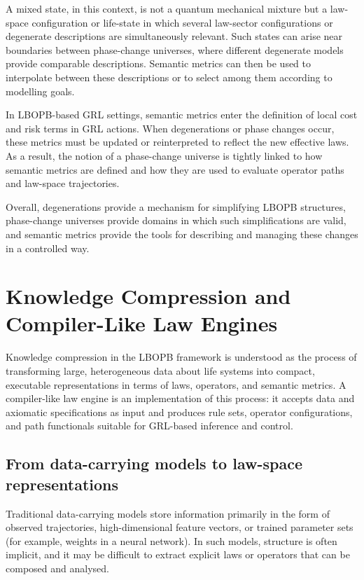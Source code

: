 \documentclass[11pt]{book}
\theoremstyle{plain}
\theoremstyle{definition}
\theoremstyle{remark}
\begin{document}
A mixed state, in this context, is not a quantum mechanical mixture but
a law-space configuration or life-state in which several law-sector
configurations or degenerate descriptions are simultaneously relevant.
Such states can arise near boundaries between phase-change universes,
where different degenerate models provide comparable descriptions.
Semantic metrics can then be used to interpolate between these
descriptions or to select among them according to modelling goals.

In LBOPB-based GRL settings, semantic metrics enter the definition of
local cost and risk terms in GRL actions. When degenerations or
phase changes occur, these metrics must be updated or reinterpreted to
reflect the new effective laws. As a result, the notion of a
phase-change universe is tightly linked to how semantic metrics are
defined and how they are used to evaluate operator paths and law-space
trajectories.

Overall, degenerations provide a mechanism for simplifying LBOPB
structures, phase-change universes provide domains in which such
simplifications are valid, and semantic metrics provide the tools for
describing and managing these changes in a controlled way.

\section{Knowledge Compression and Compiler-Like Law Engines}


Knowledge compression in the LBOPB framework is understood as the
process of transforming large, heterogeneous data about life systems
into compact, executable representations in terms of laws, operators,
and semantic metrics. A compiler-like law engine is an implementation
of this process: it accepts data and axiomatic specifications as
input and produces rule sets, operator configurations, and path
functionals suitable for GRL-based inference and control.

\subsection*{From data-carrying models to law-space representations}

Traditional data-carrying models store information primarily in the
form of observed trajectories, high-dimensional feature vectors, or
trained parameter sets (for example, weights in a neural network). In
such models, structure is often implicit, and it may be difficult to
extract explicit laws or operators that can be composed and analysed.
\end{document}

